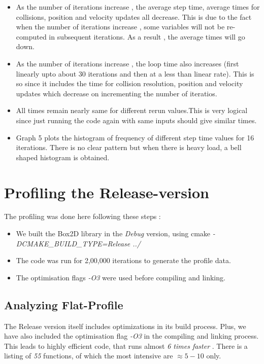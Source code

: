 \documentclass[a4paper,11pt]{article}
\begin{document}
\begin{itemize}
\item As the number of iterations increase , the average step time, average times for collisions, position and velocity updates all decrease. This is due to the fact when the number of iterations increase , some variables will not be re-computed in subsequent iterations.
As a result , the average times will go down.
\item As the number of iterations increase , the loop time also increases (first linearly upto about 30 iterations and then at a less than linear rate). This is so since it includes the time for collision resolution, position and velocity updates which decrease on incrementing the number of iteratios.
\item All times remain nearly same for different rerun values.This is very logical since just running the code again with same inputs should give similar times.
\item Graph 5 plots the histogram of frequency of different step time values for 16 iterations. There is no clear pattern but when there is heavy load, a bell shaped histogram is obtained.
\end{itemize}

\section{Profiling the Release-version}

The profiling was done here following these steps :

\begin{itemize}

\item We built the Box2D library in the \emph{Debug} version, using cmake \emph{-DCMAKE\_BUILD\_TYPE=Release ../}
\item The code was run for 2,00,000 iterations to generate the profile data. 
\item The optimisation flags \emph{-O3} were used before compiling and linking.

\end{itemize}

\subsection{Analyzing Flat-Profile}

The Release version itself includes optimizations in its build process. Plus, we have also included the optimisation flag \emph{-O3} in the compiling and linking process. This leads to highly efficient code, that runs almost \emph{6 times faster} . There is a listing of \emph{55} functions, of which the most intensive are $\approx 5-10$ only. 
\end{document}
